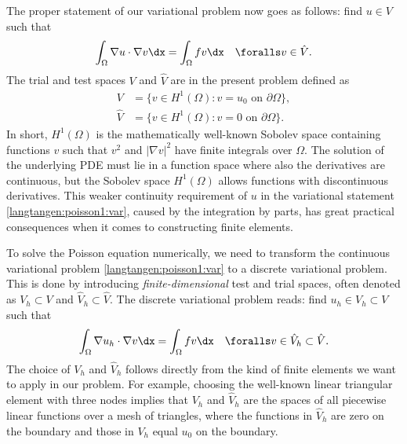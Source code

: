 The proper statement of
our variational problem now goes as follows:
find $u \in V$ such that
\begin{equation} \label{langtangen:poisson1:var}
  \int_{\Omega} \nabla u \cdot \nabla v \dx =
  \int_{\Omega} fv \dx
  \quad \foralls v \in \hat{V}.
\end{equation}
The trial and test spaces $V$ and $\hat{V}$ are in the present
problem defined as
\begin{equation}
  \begin{split}
     V      &= \{v \in H^1(\Omega) : v = u_0 \mbox{ on } \partial\Omega\}, \\
    \hat{V} &= \{v \in H^1(\Omega) : v = 0 \mbox{ on } \partial\Omega\}.
  \end{split}
\end{equation}
In short, $H^1(\Omega)$ is the mathematically well-known Sobolev
space containing functions $v$ such that $v^2$ and $|\nabla v|^2$
have finite integrals over $\Omega$. The solution of the underlying PDE
must lie in a function space where also the derivatives are continuous,
but the Sobolev space $H^1(\Omega)$ allows functions with discontinuous
derivatives. This weaker continuity requirement of $u$ in the variational
statement \eqref{langtangen:poisson1:var}, caused by the integration by
parts, has great practical consequences when it comes to constructing
finite elements.

To solve the Poisson equation numerically, we need to transform
the continuous variational problem \eqref{langtangen:poisson1:var}
to a discrete variational problem. This is done by introducing
\emph{finite-dimensional} test and trial spaces, often denoted as
$V_h\subset V$ and $\hat{V}_h\subset{\hat{V}}$. The discrete variational
problem reads: find $u_h \in V_h \subset V$ such that
\begin{equation} \label{langtangen:poisson1:vard}
  \int_{\Omega} \nabla u_h \cdot \nabla v \dx =
  \int_{\Omega} fv \dx
  \quad \foralls v \in \hat{V}_h \subset \hat{V}.
\end{equation}
The choice of $V_h$ and $\hat{V}_h$ follows directly from the kind of
finite elements we want to apply in our problem. For example, choosing
the well-known linear triangular element with three nodes implies that
$V_h$ and $\hat{V}_h$ are the spaces of all piecewise linear functions
over a mesh of triangles, where the functions in $\hat V_h$ are zero on
the boundary and those in $V_h$ equal $u_0$ on the boundary.

